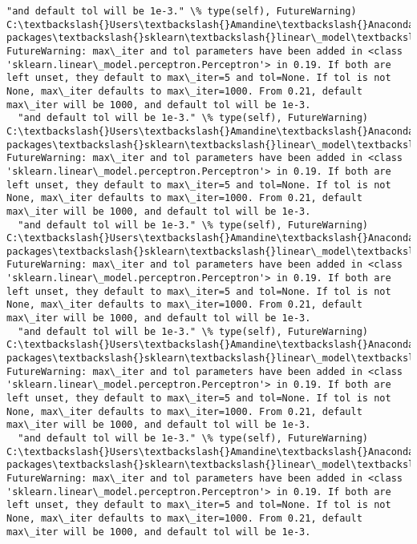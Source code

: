 \documentclass[11pt]{article}
\begin{document}
\begin{Verbatim}[commandchars=\\\{\}]
  "and default tol will be 1e-3." \% type(self), FutureWarning)
C:\textbackslash{}Users\textbackslash{}Amandine\textbackslash{}Anaconda3\textbackslash{}lib\textbackslash{}site-packages\textbackslash{}sklearn\textbackslash{}linear\_model\textbackslash{}stochastic\_gradient.py:128: FutureWarning: max\_iter and tol parameters have been added in <class 'sklearn.linear\_model.perceptron.Perceptron'> in 0.19. If both are left unset, they default to max\_iter=5 and tol=None. If tol is not None, max\_iter defaults to max\_iter=1000. From 0.21, default max\_iter will be 1000, and default tol will be 1e-3.
  "and default tol will be 1e-3." \% type(self), FutureWarning)
C:\textbackslash{}Users\textbackslash{}Amandine\textbackslash{}Anaconda3\textbackslash{}lib\textbackslash{}site-packages\textbackslash{}sklearn\textbackslash{}linear\_model\textbackslash{}stochastic\_gradient.py:128: FutureWarning: max\_iter and tol parameters have been added in <class 'sklearn.linear\_model.perceptron.Perceptron'> in 0.19. If both are left unset, they default to max\_iter=5 and tol=None. If tol is not None, max\_iter defaults to max\_iter=1000. From 0.21, default max\_iter will be 1000, and default tol will be 1e-3.
  "and default tol will be 1e-3." \% type(self), FutureWarning)
C:\textbackslash{}Users\textbackslash{}Amandine\textbackslash{}Anaconda3\textbackslash{}lib\textbackslash{}site-packages\textbackslash{}sklearn\textbackslash{}linear\_model\textbackslash{}stochastic\_gradient.py:128: FutureWarning: max\_iter and tol parameters have been added in <class 'sklearn.linear\_model.perceptron.Perceptron'> in 0.19. If both are left unset, they default to max\_iter=5 and tol=None. If tol is not None, max\_iter defaults to max\_iter=1000. From 0.21, default max\_iter will be 1000, and default tol will be 1e-3.
  "and default tol will be 1e-3." \% type(self), FutureWarning)
C:\textbackslash{}Users\textbackslash{}Amandine\textbackslash{}Anaconda3\textbackslash{}lib\textbackslash{}site-packages\textbackslash{}sklearn\textbackslash{}linear\_model\textbackslash{}stochastic\_gradient.py:128: FutureWarning: max\_iter and tol parameters have been added in <class 'sklearn.linear\_model.perceptron.Perceptron'> in 0.19. If both are left unset, they default to max\_iter=5 and tol=None. If tol is not None, max\_iter defaults to max\_iter=1000. From 0.21, default max\_iter will be 1000, and default tol will be 1e-3.
  "and default tol will be 1e-3." \% type(self), FutureWarning)
C:\textbackslash{}Users\textbackslash{}Amandine\textbackslash{}Anaconda3\textbackslash{}lib\textbackslash{}site-packages\textbackslash{}sklearn\textbackslash{}linear\_model\textbackslash{}stochastic\_gradient.py:128: FutureWarning: max\_iter and tol parameters have been added in <class 'sklearn.linear\_model.perceptron.Perceptron'> in 0.19. If both are left unset, they default to max\_iter=5 and tol=None. If tol is not None, max\_iter defaults to max\_iter=1000. From 0.21, default max\_iter will be 1000, and default tol will be 1e-3.

\end{Verbatim}
\end{document}
